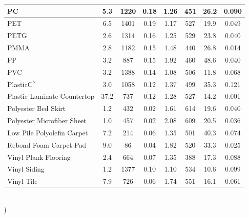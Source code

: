 \begin{table}[!h]
\begin{tabular}{|p{6.5cm}|c|c|c|c|c|c|c|}
PC                                                & 5.3  & 1220 & 0.18 & 1.26 & 451 & 26.2 & 0.090 \\\hline
PET                                               & 6.5  & 1401 & 0.19 & 1.17 & 527 & 19.9 & 0.049 \\\hline
PETG                                              & 2.6  & 1314 & 0.16 & 1.25 & 529 & 23.8 & 0.040 \\\hline
PMMA                                              & 2.8  & 1182 & 0.15 & 1.48 & 440 & 26.8 & 0.014 \\\hline
PP                                                & 3.2  & 887  & 0.15 & 1.92 & 460 & 48.6 & 0.040 \\\hline
PVC                                               & 3.2  & 1388 & 0.14 & 1.08 & 506 & 11.8 & 0.068 \\\hline
PlasticC$^{b}$                                    & 3.0  & 1058 & 0.12 & 1.37 & 499 & 35.3 & 0.121 \\\hline
Plastic Laminate Countertop                       & 37.2 & 737  & 0.12 & 1.28 & 527 & 14.2 & 0.001 \\\hline
Polyester Bed Skirt                               & 1.2  & 432  & 0.02 & 1.61 & 614 & 19.6 & 0.040 \\\hline
Polyester Microfiber Sheet                        & 1.0  & 457  & 0.02 & 2.08 & 609 & 20.5 & 0.036 \\\hline
Low Pile Polyolefin Carpet                        & 7.2  & 214  & 0.06 & 1.35 & 501 & 40.3 & 0.074 \\\hline
Rebond Foam Carpet Pad                            & 9.0  & 86   & 0.04 & 1.82 & 520 & 33.3 & 0.025 \\\hline
Vinyl Plank Flooring                              & 2.4  & 664  & 0.07 & 1.35 & 388 & 17.3 & 0.088 \\\hline
Vinyl Siding                                      & 1.2  & 1377 & 0.10 & 1.10 & 534 & 10.6 & 0.099 \\\hline
Vinyl Tile                                        & 7.9  & 726  & 0.06 & 1.74 & 551 & 16.1 & 0.061 \\\hline
\end{tabular}
\label{Properties_FSRI_Materials_Polymers}
\end{table}
\vspace{-0.4cm}
\\
)\\

